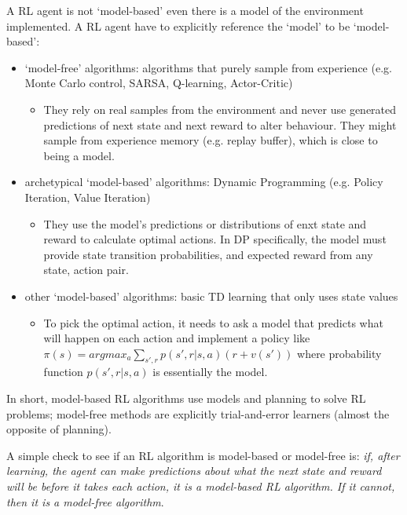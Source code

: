 \documentclass[lang=en,mode=normal,device=normal,color=blue,12pt]{elegantnote}
\DeclareMathOperator*{\1}{\mathbbm{1}}
\begin{document}
A RL agent is not `model-based' even there is a model of the environment implemented. A RL agent have to explicitly reference the `model' to be `model-based':

\begin{itemize}
\item `model-free' algorithms: algorithms that purely sample from experience (e.g. Monte Carlo control, SARSA, Q-learning, Actor-Critic)
\begin{itemize}
\item They rely on real samples from the environment and never use generated predictions of next state and next reward to alter behaviour. They might sample from experience memory (e.g. replay buffer), which is close to being a model.
\end{itemize}
\item archetypical `model-based' algorithms: Dynamic Programming (e.g. Policy Iteration, Value Iteration)
\begin{itemize}
\item They use the model's predictions or distributions of enxt state and reward to calculate optimal actions. In DP specifically, the model must provide state transition probabilities, and expected reward from any state, action pair.
\end{itemize}
\item other `model-based' algorithms: basic TD learning that only uses state values
\begin{itemize}
\item To pick the optimal action, it needs to ask a model that predicts what will happen on each action and implement a policy like $\pi(s) = argmax_a \sum_{s',r} p(s',r|s,a)(r+v(s'))$ where probability function $p(s',r|s,a)$ is essentially the model.
\end{itemize}
\end{itemize}

In short, model-based RL algorithms use models and planning to solve RL problems; model-free methods are explicitly trial-and-error learners (almost the opposite of planning).

A simple check to see if an RL algorithm is model-based or model-free is: \textit{if, after learning, the agent can make predictions about what the next state and reward will be before it takes each action, it is a model-based RL algorithm. If it cannot, then it is a model-free algorithm}.

\end{document}
